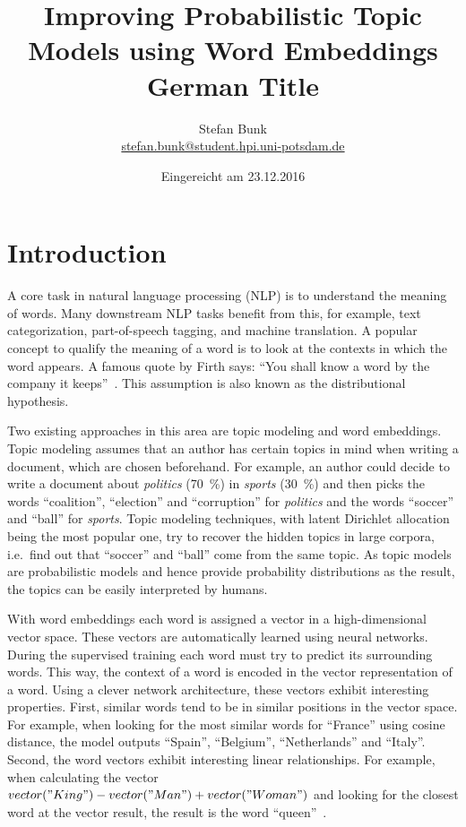 \documentclass[
        a4paper,
        titlepage,
        twoside,
        parskip
        ]{scrbook}
\title{Improving Probabilistic Topic Models using Word Embeddings
\\ \bigskip
\large{German Title}}
\author{Stefan Bunk\\{\small{\url{stefan.bunk@student.hpi.uni-potsdam.de}}}}
\date{Eingereicht am 23.12.2016}
\theoremstyle{break}
\begin{document}
\maketitle
\cleardoublepage


\tableofcontents

\chapter{Introduction}
A core task in natural language processing (NLP) is to understand the meaning of words.
Many downstream NLP tasks benefit from this, for example, text categorization, part-of-speech tagging, and machine translation.
A popular concept to qualify the meaning of a word is to look at the contexts in which the word appears.
A famous quote by Firth says: ``You shall know a word by the company it keeps''~\cite{Firth1957}.
This assumption is also known as the distributional hypothesis.

Two existing approaches in this area are topic modeling and word embeddings.
Topic modeling assumes that an author has certain topics in mind when writing a document, which are chosen beforehand.
For example, an author could decide to write a document about \emph{politics} (70~\%) in \emph{sports} (30~\%) and then picks the words ``coalition'', ``election'' and ``corruption'' for \emph{politics} and the words ``soccer'' and ``ball'' for \emph{sports}.
Topic modeling techniques, with latent Dirichlet allocation being the most popular one, try to recover the hidden topics in large corpora, i.e.\ find out that ``soccer'' and ``ball'' come from the same topic.
As topic models are probabilistic models and hence provide probability distributions as the result, the topics can be easily interpreted by humans.

With word embeddings each word is assigned a vector in a high-dimensional vector space.
These vectors are automatically learned using neural networks.
During the supervised training each word must try to predict its surrounding words.
This way, the context of a word is encoded in the vector representation of a word.
Using a clever network architecture, these vectors exhibit interesting properties.
First, similar words tend to be in similar positions in the vector space.
For example, when looking for the most similar words for ``France'' using cosine distance, the model outputs ``Spain'', ``Belgium'', ``Netherlands'' and ``Italy''.
Second, the word vectors exhibit interesting linear relationships.
For example, when calculating the vector $vector("King") - vector("Man") + vector("Woman")$ and looking for the closest word at the vector result, the result is the word ``queen''~\cite{Mikolov2013b}.
\end{document}
